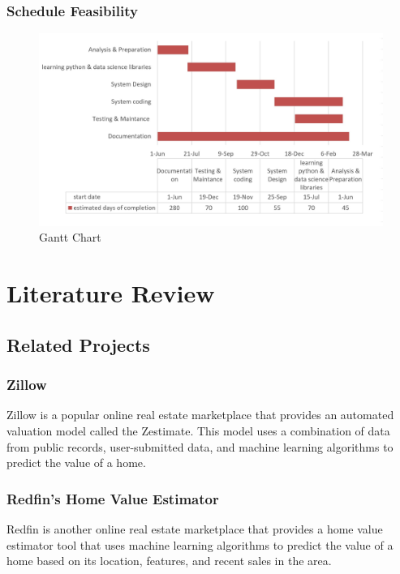 \subsection{Schedule Feasibility}
\vspace{-18pt}
\begin{figure}[!h] %
\begin{center}
	\includegraphics[width=6in]{Screenshot 2023-03-23 005901.jpg} 
	\caption{Gantt Chart} %
	\label{figGanttChart} %
\end{center}
\end{figure}
\chapter{Literature Review}
\vspace{-18pt}
\section{Related Projects}
\vspace{-18pt}
\subsection{Zillow}
\vspace{-18pt}
 Zillow is a popular online real estate marketplace that provides an automated valuation model called the Zestimate. This model uses a combination of data from public records, user-submitted data, and machine learning algorithms to predict the value of a home.
 \vspace{-10pt}
\subsection{Redfin's Home Value Estimator}
\vspace{-18pt}
Redfin is another online real estate marketplace that provides a home value estimator tool that uses machine learning algorithms to predict the value of a home based on its location, features, and recent sales in the area.
\vspace{-10pt}
